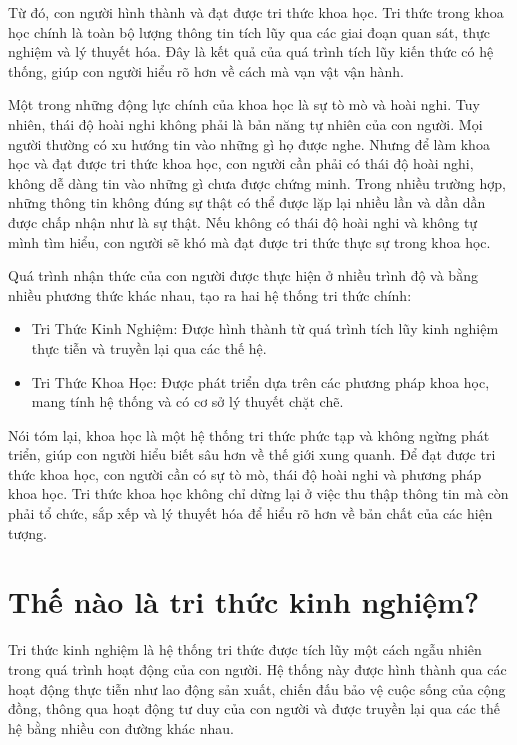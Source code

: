 Từ đó, con người hình thành và đạt được tri thức khoa học. Tri thức trong khoa học chính là toàn bộ lượng thông tin tích lũy qua các giai đoạn quan sát, thực nghiệm và lý thuyết hóa. Đây là kết quả của quá trình tích lũy kiến thức có hệ thống, giúp con người hiểu rõ hơn về cách mà vạn vật vận hành.

Một trong những động lực chính của khoa học là sự tò mò và hoài nghi. Tuy nhiên, thái độ hoài nghi không phải là bản năng tự nhiên của con người. Mọi người thường có xu hướng tin vào những gì họ được nghe. Nhưng để làm khoa học và đạt được tri thức khoa học, con người cần phải có thái độ hoài nghi, không dễ dàng tin vào những gì chưa được chứng minh. Trong nhiều trường hợp, những thông tin không đúng sự thật có thể được lặp lại nhiều lần và dần dần được chấp nhận như là sự thật. Nếu không có thái độ hoài nghi và không tự mình tìm hiểu, con người sẽ khó mà đạt được tri thức thực sự trong khoa học.

Quá trình nhận thức của con người được thực hiện ở nhiều trình độ và bằng nhiều phương thức khác nhau, tạo ra hai hệ thống tri thức chính:
\begin{itemize}
    \item Tri Thức Kinh Nghiệm: Được hình thành từ quá trình tích lũy kinh nghiệm thực tiễn và truyền lại qua các thế hệ.
    \item Tri Thức Khoa Học: Được phát triển dựa trên các phương pháp khoa học, mang tính hệ thống và có cơ sở lý thuyết chặt chẽ.
\end{itemize}

Nói tóm lại, khoa học là một hệ thống tri thức phức tạp và không ngừng phát triển, giúp con người hiểu biết sâu hơn về thế giới xung quanh. Để đạt được tri thức khoa học, con người cần có sự tò mò, thái độ hoài nghi và phương pháp khoa học. Tri thức khoa học không chỉ dừng lại ở việc thu thập thông tin mà còn phải tổ chức, sắp xếp và lý thuyết hóa để hiểu rõ hơn về bản chất của các hiện tượng.

\section{Thế nào là tri thức kinh nghiệm?}

Tri thức kinh nghiệm là hệ thống tri thức được tích lũy một cách ngẫu nhiên trong quá trình hoạt động của con người. Hệ thống này được hình thành qua các hoạt động thực tiễn như lao động sản xuất, chiến đấu bảo vệ cuộc sống của cộng đồng, thông qua hoạt động tư duy của con người và được truyền lại qua các thế hệ bằng nhiều con đường khác nhau.

